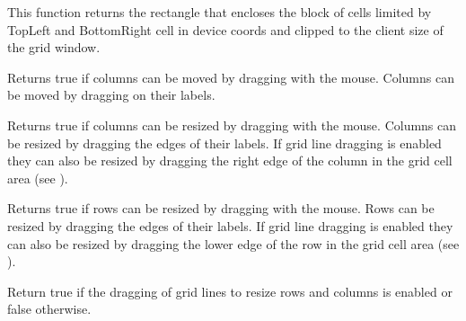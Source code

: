 



\label{wxgridblocktodevicerect}


This function returns the rectangle that encloses the block of cells
limited by TopLeft and BottomRight cell in device coords and clipped
to the client size of the grid window.



\label{wxgridcandragcolmove}


Returns true if columns can be moved by dragging with the mouse. Columns can be moved
by dragging on their labels.



\label{wxgridcandragcolsize}


Returns true if columns can be resized by dragging with the mouse. Columns can be resized
by dragging the edges of their labels. If grid line dragging is enabled they can also be
resized by dragging the right edge of the column in the grid cell area
(see ).



\label{wxgridcandragrowsize}


Returns true if rows can be resized by dragging with the mouse. Rows can be resized
by dragging the edges of their labels. If grid line dragging is enabled they can also be
resized by dragging the lower edge of the row in the grid cell area
(see ).



\label{wxgridcandraggridsize}


Return true if the dragging of grid lines to resize rows and columns is enabled or false otherwise.



